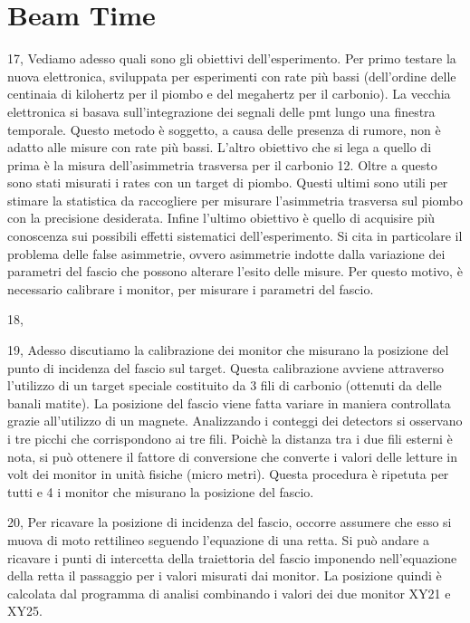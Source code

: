 \documentclass[11pt,a4paper]{article}
\begin{document}
\section{Beam Time}
\begin{list}{\textbf{slide}}{}

\item 17, Vediamo adesso quali sono gli obiettivi dell'esperimento. Per primo testare la nuova elettronica, sviluppata per esperimenti con rate più bassi (dell'ordine delle centinaia di kilohertz per il piombo e del megahertz per il carbonio). La vecchia elettronica si basava sull'integrazione dei segnali delle pmt lungo una finestra temporale. Questo metodo è soggetto, a causa delle presenza di rumore, non è adatto alle misure con rate più bassi. L'altro obiettivo che si lega a quello di prima è la misura dell'asimmetria trasversa per il carbonio 12. Oltre a questo sono stati misurati i rates con un target di piombo. Questi ultimi sono utili per stimare la statistica da raccogliere per misurare l'asimmetria trasversa sul piombo con la precisione desiderata. Infine l'ultimo obiettivo è quello di acquisire più conoscenza sui possibili effetti sistematici dell'esperimento. Si cita in particolare il problema delle false asimmetrie, ovvero asimmetrie indotte dalla variazione dei parametri del fascio che possono alterare l'esito delle misure. Per questo motivo, è necessario calibrare i monitor, per misurare i parametri del fascio.

\item 18,

\item

\item 19, Adesso discutiamo la calibrazione dei monitor che misurano la posizione del punto di incidenza del fascio sul target. Questa calibrazione avviene attraverso l'utilizzo di un target speciale costituito da 3 fili di carbonio (ottenuti da delle banali matite). La posizione del fascio viene fatta variare in maniera controllata grazie all'utilizzo di un magnete. Analizzando i conteggi dei detectors si osservano i tre picchi che corrispondono ai tre fili. Poichè la distanza tra i due fili esterni è nota, si può ottenere il fattore di conversione che converte i valori delle letture in volt dei monitor in unità fisiche (micro metri). Questa procedura è ripetuta per tutti e 4 i monitor che misurano la posizione del fascio.

\item 20, Per ricavare la posizione di incidenza del fascio, occorre assumere che esso si muova di moto rettilineo seguendo l'equazione di una retta. Si può andare a ricavare i punti di intercetta della traiettoria del fascio imponendo nell'equazione della retta il passaggio per i valori misurati dai monitor. La posizione quindi è calcolata dal programma di analisi combinando i valori dei due monitor XY21 e XY25.


\end{list}
\end{document}
